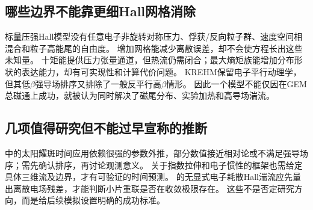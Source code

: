 \documentclass[UTF8,a4paper,11pt,openany,fontset=fandol]{ctexbook}
\begin{document}
\subsection{哪些边界不能靠更细Hall网格消除}
标量压强Hall模型没有任意电子非旋转对称压力、俘获/反向粒子群、速度空间相混合和粒子高能尾的自由度。
增加网格能减少离散误差，却不会使方程长出这些未知量。
十矩能提供压力张量通道，但热流仍需闭合；最大熵矩族能增加分布形状的表达能力，却有可实现性和计算代价问题。
KREHM保留电子平行动理学，但其低$\beta$强导场排序又排除了一般反平行高$\beta$情形。
因此一个模型不能仅因在GEM总磁通上成功，就被认为同时解决了磁尾分布、实验加热和高导场湍流。

\subsection{几项值得研究但不能过早宣称的推断}
\citet{F697}中的太阳耀斑时间应用依赖很强的参数外推，部分数值接近相对论或不满足强导场序；需先确认排序，再讨论观测意义。
\citet{L313}关于指数拉伸和电子惯性的框架也需给定具体三维流及边界，才有可验证的时间预测。
\citet{F644}的无显式电子耗散Hall湍流应先量出离散电场残差，才能判断小片重联是否在收敛极限存在。
这些不是否定研究方向，而是给后续模拟设置明确的成功标准。


\end{document}
